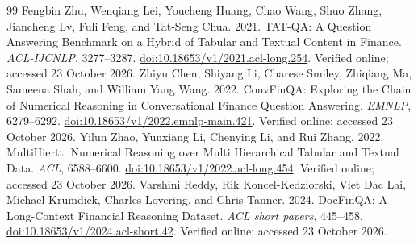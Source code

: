 \begin{thebibliography}{99}
 Fengbin Zhu, Wenqiang Lei, Youcheng Huang, Chao Wang, Shuo Zhang, Jiancheng Lv, Fuli Feng, and Tat-Seng Chua. 2021. TAT-QA: A Question Answering Benchmark on a Hybrid of Tabular and Textual Content in Finance. \emph{ACL-IJCNLP}, 3277--3287. \href{https://aclanthology.org/2021.acl-long.254/}{doi:10.18653/v1/2021.acl-long.254}. Verified online; accessed 23 October 2026.
 Zhiyu Chen, Shiyang Li, Charese Smiley, Zhiqiang Ma, Sameena Shah, and William Yang Wang. 2022. ConvFinQA: Exploring the Chain of Numerical Reasoning in Conversational Finance Question Answering. \emph{EMNLP}, 6279--6292. \href{https://aclanthology.org/2022.emnlp-main.421/}{doi:10.18653/v1/2022.emnlp-main.421}. Verified online; accessed 23 October 2026.
 Yilun Zhao, Yunxiang Li, Chenying Li, and Rui Zhang. 2022. MultiHiertt: Numerical Reasoning over Multi Hierarchical Tabular and Textual Data. \emph{ACL}, 6588--6600. \href{https://aclanthology.org/2022.acl-long.454/}{doi:10.18653/v1/2022.acl-long.454}. Verified online; accessed 23 October 2026.
 Varshini Reddy, Rik Koncel-Kedziorski, Viet Dac Lai, Michael Krumdick, Charles Lovering, and Chris Tanner. 2024. DocFinQA: A Long-Context Financial Reasoning Dataset. \emph{ACL short papers}, 445--458. \href{https://aclanthology.org/2024.acl-short.42/}{doi:10.18653/v1/2024.acl-short.42}. Verified online; accessed 23 October 2026.


\end{thebibliography}
